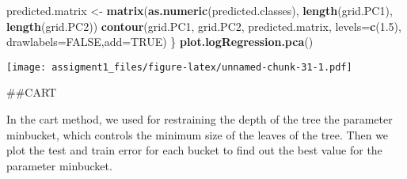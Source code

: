 \documentclass[
]{article}
\newenvironment{Shaded}{\begin{snugshade}}{\end{snugshade}}
\newcommand{\DataTypeTok}[1]{\textcolor[rgb]{0.13,0.29,0.53}{#1}}
\newcommand{\FloatTok}[1]{\textcolor[rgb]{0.00,0.00,0.81}{#1}}
\newcommand{\KeywordTok}[1]{\textcolor[rgb]{0.13,0.29,0.53}{\textbf{#1}}}
\newcommand{\NormalTok}[1]{#1}
\newcommand{\OtherTok}[1]{\textcolor[rgb]{0.56,0.35,0.01}{#1}}
\newcommand{\StringTok}[1]{\textcolor[rgb]{0.31,0.60,0.02}{#1}}
\begin{document}
\begin{Shaded}
\begin{Highlighting}[]
\NormalTok{  predicted.matrix <-}\StringTok{ }\KeywordTok{matrix}\NormalTok{(}\KeywordTok{as.numeric}\NormalTok{(predicted.classes), }\KeywordTok{length}\NormalTok{(grid.PC1), }\KeywordTok{length}\NormalTok{(grid.PC2))}
  \KeywordTok{contour}\NormalTok{(grid.PC1, grid.PC2, predicted.matrix, }\DataTypeTok{levels=}\KeywordTok{c}\NormalTok{(}\FloatTok{1.5}\NormalTok{), }\DataTypeTok{drawlabels=}\OtherTok{FALSE}\NormalTok{,}\DataTypeTok{add=}\OtherTok{TRUE}\NormalTok{)}
\NormalTok{\}}
\KeywordTok{plot.logRegression.pca}\NormalTok{()}
\end{Highlighting}
\end{Shaded}

\texttt{[image: assigment1\_files/figure-latex/unnamed-chunk-31-1.pdf]}

\#\#CART

In the cart method, we used for restraining the depth of the tree the
parameter minbucket, which controls the minimum size of the leaves of
the tree. Then we plot the test and train error for each bucket to find
out the best value for the parameter minbucket.
\end{document}

